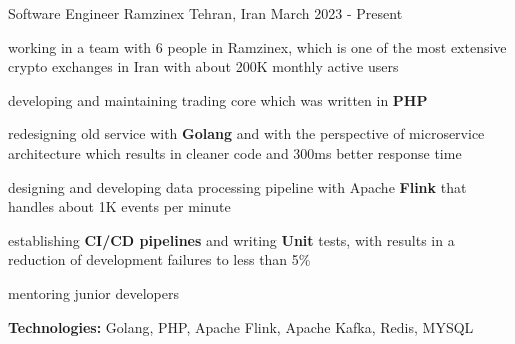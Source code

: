 

\begin{cventries}

  \cventry
    {Software Engineer} %
    {Ramzinex} %
    {Tehran, Iran} %
    {March 2023 - Present} %
    {
      \begin{cvitems} %
        \item working in a team with 6 people in Ramzinex, which is one of the most extensive crypto exchanges in Iran with about 200K monthly active users
        \item developing and maintaining trading core which was written in \textbf{PHP}
        \item redesigning old service with \textbf{Golang} and with the perspective of microservice architecture which results in cleaner code and 300ms better response time
        \item designing and developing data processing pipeline with Apache \textbf{Flink} that handles about 1K events per minute
        \item establishing \textbf{CI/CD pipelines} and writing \textbf{Unit} tests, with results in a reduction of development failures to less than 5\%
        \item mentoring junior developers
        \item \textbf{Technologies:} Golang, PHP, Apache Flink, Apache Kafka, Redis, MYSQL
      \end{cvitems}
    }


\end{cventries}
